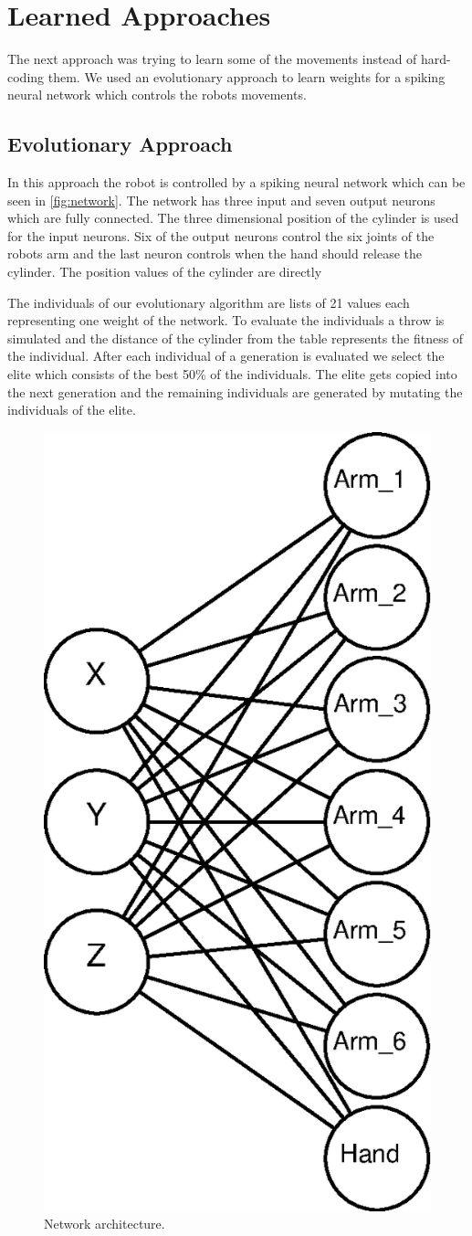 \section{Learned Approaches}
The next approach was trying to learn some of the movements instead of hard-coding them.
We used an evolutionary approach to learn weights for a spiking neural network which controls the robots movements.

\subsection{Evolutionary Approach}
In this approach the robot is controlled by a spiking neural network which can be seen in \autoref{fig:network}.
The network has three input and seven output neurons which are fully connected.
The three dimensional position of the cylinder is used for the input neurons.
Six of the output neurons control the six joints of the robots arm and the last neuron controls when the hand should release the cylinder.
The position values of the cylinder are directly

The individuals of our evolutionary algorithm are lists of 21 values each representing one weight of the network.
To evaluate the individuals a throw is simulated and the distance of the cylinder from the table represents the fitness of the individual.
After each individual of a generation is evaluated we select the elite which consists of the best 50\% of the individuals.
The elite gets copied into the next generation and the remaining individuals are generated by mutating the individuals of the elite.

\begin{figure}[h]
\centering
\includegraphics[width=.5\columnwidth]{figures/net.eps}
\caption{Network architecture.}
\label{fig:network}
\end{figure}

